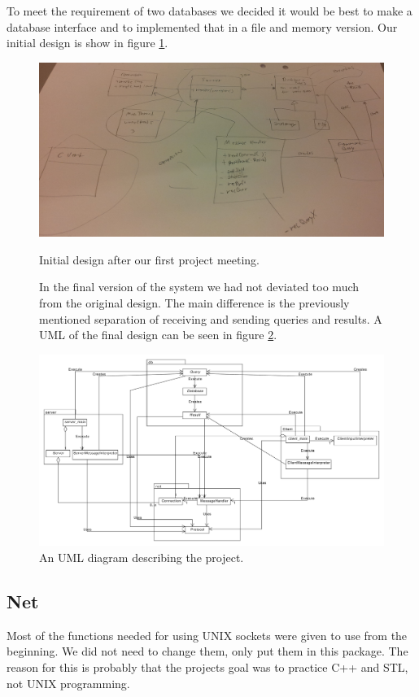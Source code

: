 \documentclass[10pt, a4paper]{article}
\begin{document}
To meet the requirement of two databases we decided it would be best to make a database interface and to implemented that in a file and memory version. Our initial design is show in figure \ref{init+design}.

\begin{figure}[hbt]
\includegraphics[scale=0.4]{img/uml_blueprint.png}
\label{init+design}
\caption{Initial design after our first project meeting.}
\end{figure}
\clearpage
\begin{figure}[hbt]


In the final version of the system we had not deviated too much from the original design. The main difference is the previously mentioned separation of receiving and sending queries and results. A UML of the final design can be seen in figure \ref{UML}.

\begin{center}
\includegraphics[scale=0.3]{uml.pdf}
\end{center}
\label{UML}
\caption{An UML diagram describing the project.}
\end{figure}

\subsection{Net}
Most of the functions needed for using UNIX sockets were given to use from the beginning. We did not need to change them, only put them in this package. The reason for this is probably that the projects goal was to practice C++ and STL, not UNIX programming.
\end{document}

